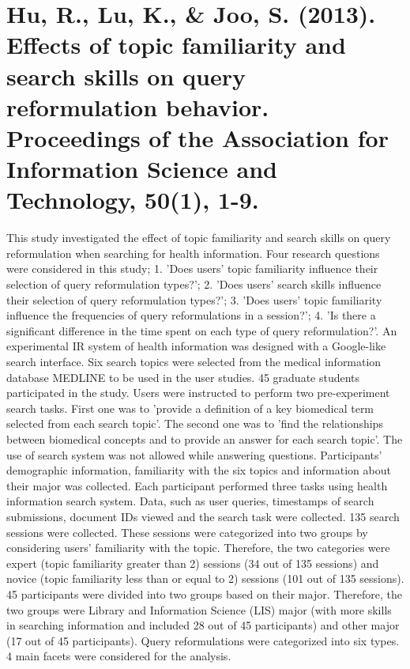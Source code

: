 \documentclass[]{article}
\begin{document}
\section{Hu, R., Lu, K., \& Joo, S. (2013). Effects of topic familiarity and search skills on query reformulation behavior. Proceedings of the Association for Information Science and Technology, 50(1), 1-9.}

This study investigated the effect of topic familiarity and search skills on query reformulation when searching for health information. Four research questions were considered in this study; 1. 'Does users' topic familiarity influence their selection of query reformulation types?'; 2. 'Does users' search skills influence their selection of query reformulation types?'; 3. 'Does users' topic familiarity influence the frequencies of query reformulations in a session?'; 4. 'Is there a significant difference in the time spent on each type of query reformulation?'. An experimental IR system of health information was designed with a Google-like search interface. Six search topics were selected from the medical information database MEDLINE to be used in the user studies. 45 graduate students participated in the study. Users were instructed to perform two pre-experiment search tasks. First one was to 'provide a definition of a key biomedical term selected from each search topic'. The second one was to 'find the relationships between biomedical concepts and to provide an answer for each search topic'. The use of search system was not allowed while answering questions. Participants' demographic information, familiarity with the six topics and information about their major was collected. Each participant performed three tasks using health information search system. Data, such as user queries, timestamps of search submissions, document IDs viewed and the search task were collected. 135 search sessions were collected. These sessions were categorized into two groups by considering users' familiarity with the topic. Therefore, the two categories were expert (topic familiarity greater than 2) sessions (34 out of 135 sessions) and novice (topic familiarity less than or equal to 2) sessions (101 out of 135 sessions). 45 participants were divided into two groups based on their major. Therefore, the two groups were Library and Information Science (LIS) major (with more skills in searching information and included 28 out of 45 participants) and other major (17 out of 45 participants). Query reformulations were categorized into six types. 4 main facets were considered for the analysis. 
\end{document}
